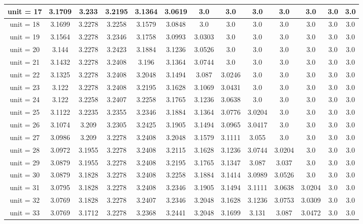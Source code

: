 \begin{table*}[ht]
\begin{tabular}{|c|c|c|c|c|c|c|c|c|c|c|c|c|}
\hline
unit = 17 &
3.1709 & 3.233 & 3.2195 & 3.1364 & 3.0619 & 3.0 & 3.0 & 3.0 & 3.0 & 3.0 & 3.0 & 3.0 \\
\hline
unit = 18 &
3.1699 & 3.2278 & 3.2258 & 3.1579 & 3.0848 & 3.0 & 3.0 & 3.0 & 3.0 & 3.0 & 3.0 & 3.0 \\
\hline
unit = 19 &
3.1564 & 3.2278 & 3.2346 & 3.1758 & 3.0993 & 3.0303 & 3.0 & 3.0 & 3.0 & 3.0 & 3.0 & 3.0 \\
\hline
unit = 20 &
3.144 & 3.2278 & 3.2423 & 3.1884 & 3.1236 & 3.0526 & 3.0 & 3.0 & 3.0 & 3.0 & 3.0 & 3.0 \\
\hline
unit = 21 &
3.1432 & 3.2278 & 3.2408 & 3.196 & 3.1364 & 3.0744 & 3.0 & 3.0 & 3.0 & 3.0 & 3.0 & 3.0 \\
\hline
unit = 22 &
3.1325 & 3.2278 & 3.2408 & 3.2048 & 3.1494 & 3.087 & 3.0246 & 3.0 & 3.0 & 3.0 & 3.0 & 3.0 \\
\hline
unit = 23 &
3.122 & 3.2278 & 3.2408 & 3.2195 & 3.1628 & 3.1069 & 3.0431 & 3.0 & 3.0 & 3.0 & 3.0 & 3.0 \\
\hline
unit = 24 &
3.122 & 3.2258 & 3.2407 & 3.2258 & 3.1765 & 3.1236 & 3.0638 & 3.0 & 3.0 & 3.0 & 3.0 & 3.0 \\
\hline
unit = 25 &
3.1122 & 3.2235 & 3.2355 & 3.2346 & 3.1884 & 3.1364 & 3.0776 & 3.0204 & 3.0 & 3.0 & 3.0 & 3.0 \\
\hline
unit = 26 &
3.1074 & 3.209 & 3.2305 & 3.2425 & 3.1905 & 3.1494 & 3.0965 & 3.0417 & 3.0 & 3.0 & 3.0 & 3.0 \\
\hline
unit = 27 &
3.0986 & 3.209 & 3.2278 & 3.2408 & 3.2048 & 3.1579 & 3.1111 & 3.055 & 3.0 & 3.0 & 3.0 & 3.0 \\
\hline
unit = 28 &
3.0972 & 3.1955 & 3.2278 & 3.2408 & 3.2115 & 3.1628 & 3.1236 & 3.0744 & 3.0204 & 3.0 & 3.0 & 3.0 \\
\hline
unit = 29 &
3.0879 & 3.1955 & 3.2278 & 3.2408 & 3.2195 & 3.1765 & 3.1347 & 3.087 & 3.037 & 3.0 & 3.0 & 3.0 \\
\hline
unit = 30 &
3.0879 & 3.1828 & 3.2278 & 3.2408 & 3.2258 & 3.1884 & 3.1414 & 3.0989 & 3.0526 & 3.0 & 3.0 & 3.0 \\
\hline
unit = 31 &
3.0795 & 3.1828 & 3.2278 & 3.2408 & 3.2346 & 3.1905 & 3.1494 & 3.1111 & 3.0638 & 3.0204 & 3.0 & 3.0 \\
\hline
unit = 32 &
3.0769 & 3.1828 & 3.2278 & 3.2407 & 3.2346 & 3.2048 & 3.1628 & 3.1236 & 3.0753 & 3.0309 & 3.0 & 3.0 \\
\hline
unit = 33 &
3.0769 & 3.1712 & 3.2278 & 3.2368 & 3.2441 & 3.2048 & 3.1699 & 3.131 & 3.087 & 3.0472 & 3.0 & 3.0 \\

\end{tabular}
\end{table*}
